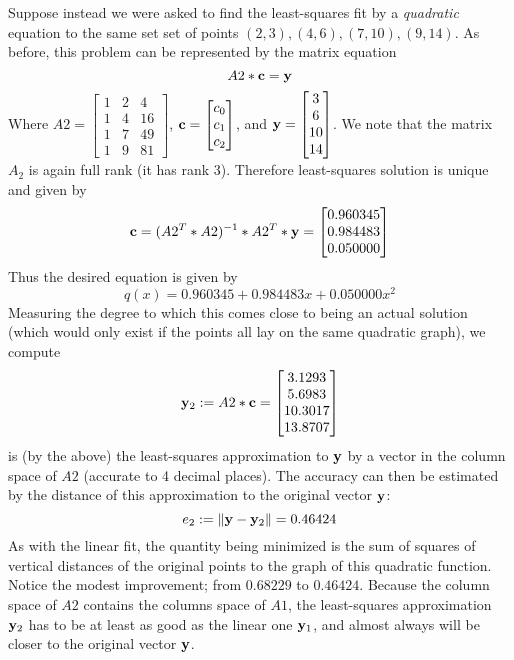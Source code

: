 \documentclass{ximera}
\begin{document}
\begin{example} Suppose instead we were asked to find the least-squares fit by a {\it quadratic} equation to the same set set of points $(2,3), (4,6), (7,10), (9,14)$. As before, this problem can be represented by the matrix equation
\[
A2*{\bf c} = {\bf y}
\]
Where $A2 = \begin{bmatrix} 1 & 2 & 4\\1 & 4 & 16\\1 & 7 & 49\\1 & 9 & 81\end{bmatrix}$, ${\bf c} = \begin{bmatrix}c_0\\c_1\\c_2\end{bmatrix}$, and ${\bf y} = \begin{bmatrix} 3\\6\\10\\14\end{bmatrix}$. We note that the matrix $A_2$ is again full rank (it has rank 3). Therefore least-squares solution is unique and given by
\[
{\bf c} = (A2^T*A2)^{-1}*A2^T*{\bf y} = \begin{bmatrix} 0.960345\\ 0.984483\\0.050000\end{bmatrix}
\]
Thus the desired equation is given by
\[
q(x) = 0.960345 + 0.984483 x + 0.050000 x^2
\]
Measuring the degree to which this comes close to being an actual solution (which would only exist if the points all lay on the same quadratic graph), we compute
\[
{\bf y}_2 := A2*{\bf c} = \begin{bmatrix} 3.1293\\ 5.6983\\ 10.3017\\ 13.8707\end{bmatrix}
\]
is (by the above) the least-squares approximation to $\bf y$ by a vector in the column space of $A2$ (accurate to 4 decimal places). The accuracy can then be estimated by the distance of this approximation to the original vector $\bf y$:
\[
e_2 := \|{\bf y} - {\bf y}_2\| = 0.46424
\]
As with the linear fit, the quantity being minimized is the sum of squares of vertical distances of the original points to the graph of this quadratic function. Notice the modest improvement; from $0.68229$ to $0.46424$. Because the column space of $A2$ contains the columns space of $A1$, the least-squares approximation ${\bf y}_2$ has to be at least as good as the linear one ${\bf y}_1$, and almost always will be closer to the original vector $\bf y$.
\end{example}
\end{document}
